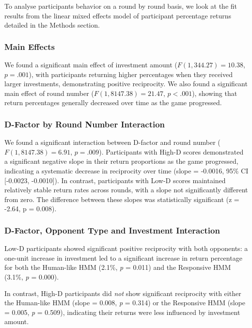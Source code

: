 \documentclass[
]{article}
\begin{document}
To analyse participants behavior on a round by round basis, we look at the fit results from the linear mixed effects model of participant percentage returns detailed in the Methods section.

\subsubsection{Main Effects}\label{main-effects}

We found a significant main effect of investment amount (\(F(1, 344.27) = 10.38\), \(p = .001\)), with participants returning higher percentages when they received larger investments, demonstrating positive reciprocity.
We also found a significant main effect of round number (\(F(1, 8147.38) = 21.47\), \(p < .001\)), showing that return percentages generally decreased over time as the game progressed.

\subsubsection{D-Factor by Round Number Interaction}\label{d-factor-by-round-number-interaction}

We found a significant interaction between D-factor and round number (\(F(1, 8147.38) = 6.91\), \(p = .009\)).
Participants with High-D scores demonstrated a significant negative slope in their return proportions as the game progressed, indicating a systematic decrease in reciprocity over time (slope = -0.0016, 95\% CI {[}-0.0023, -0.0010{]}).
In contrast, participants with Low-D scores maintained relatively stable return rates across rounds, with a slope not significantly different from zero.
The difference between these slopes was statistically significant (z = -2.64, p = 0.008).

\subsubsection{D-Factor, Opponent Type and Investment Interaction}\label{d-factor-opponent-type-and-investment-interaction}

Low-D participants showed significant positive reciprocity with both opponents: a one-unit increase in investment led to a significant increase in return percentage for both the Human-like HMM (2.1\%, \emph{p} = 0.011) and the Responsive HMM (3.1\%, \emph{p} = 0.000).

In contrast, High-D participants did \emph{not} show significant reciprocity with either the Human-like HMM (slope = 0.008, \emph{p} = 0.314) or the Responsive HMM (slope = 0.005, \emph{p} = 0.509), indicating their returns were less influenced by investment amount.
\end{document}
